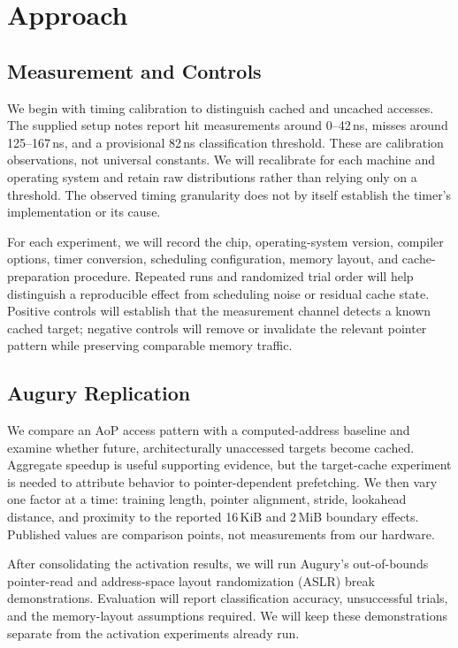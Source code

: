 \section{Approach}
\subsection{Measurement and Controls}
We begin with timing calibration to distinguish cached and uncached accesses. The supplied setup notes report hit measurements around 0--42\,ns, misses around 125--167\,ns, and a provisional 82\,ns classification threshold. These are calibration observations, not universal constants. We will recalibrate for each machine and operating system and retain raw distributions rather than relying only on a threshold. The observed timing granularity does not by itself establish the timer's implementation or its cause.

For each experiment, we will record the chip, operating-system version, compiler options, timer conversion, scheduling configuration, memory layout, and cache-preparation procedure. Repeated runs and randomized trial order will help distinguish a reproducible effect from scheduling noise or residual cache state. Positive controls will establish that the measurement channel detects a known cached target; negative controls will remove or invalidate the relevant pointer pattern while preserving comparable memory traffic.

\subsection{Augury Replication}
We compare an AoP access pattern with a computed-address baseline and examine whether future, architecturally unaccessed targets become cached. Aggregate speedup is useful supporting evidence, but the target-cache experiment is needed to attribute behavior to pointer-dependent prefetching. We then vary one factor at a time: training length, pointer alignment, stride, lookahead distance, and proximity to the reported 16\,KiB and 2\,MiB boundary effects. Published values are comparison points, not measurements from our hardware.

After consolidating the activation results, we will run Augury's out-of-bounds pointer-read and address-space layout randomization (ASLR) break demonstrations. Evaluation will report classification accuracy, unsuccessful trials, and the memory-layout assumptions required. We will keep these demonstrations separate from the activation experiments already run.

